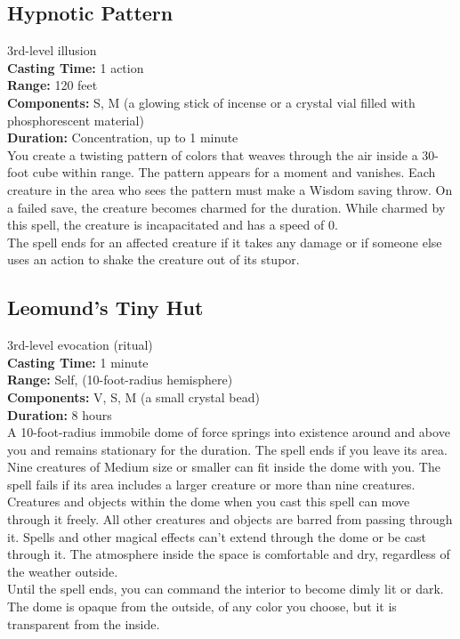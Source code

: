 \documentclass[11pt, A4paper, english]{article}
\begin{document}
		\subsection{Hypnotic Pattern}
3rd-level illusion \\
\textbf{Casting Time:} 1 action \\
\textbf{Range:} 120 feet \\
\textbf{Components:} S, M (a glowing stick of incense or a crystal vial filled with phosphorescent material) \\
\textbf{Duration:} Concentration, up to 1 minute \\
You create a twisting pattern of colors that weaves through the air inside a 30-foot cube within range. The pattern appears for a moment and vanishes. Each creature in the area who sees the pattern must make a Wisdom saving throw. On a failed save, the creature becomes charmed for the duration. While charmed by this spell, the creature is incapacitated and has a speed of 0. \\
The spell ends for an affected creature if it takes any damage or if someone else uses an action to shake the creature out of its stupor.

		\subsection{Leomund’s Tiny Hut}
3rd-level evocation (ritual) \\
\textbf{Casting Time:} 1 minute \\
\textbf{Range:} Self, (10-foot-radius hemisphere) \\
\textbf{Components:} V, S, M (a small crystal bead) \\
\textbf{Duration:} 8 hours \\
A 10-foot-radius immobile dome of force springs into existence around and above you and remains stationary for the duration. The spell ends if you leave its area. \\
Nine creatures of Medium size or smaller can fit inside the dome with you. The spell fails if its area includes a larger creature or more than nine creatures. Creatures and objects within the dome when you cast this spell can move through it freely. All other creatures and objects are barred from passing through it. Spells and other magical effects can’t extend through the dome or be cast through it. The atmosphere inside the space is comfortable and dry, regardless of the weather outside. \\
Until the spell ends, you can command the interior to become dimly lit or dark. The dome is opaque from the outside, of any color you choose, but it is transparent from the inside.
\end{document}
